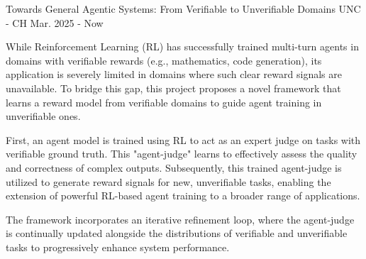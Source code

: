 \begin{cventries}
	\cventry
	{} %
	{Towards General Agentic Systems: From Verifiable to Unverifiable Domains} %
	{UNC - CH} %
	{Mar. 2025 - Now} %
	{
		\begin{cvitems} %
			\item While Reinforcement Learning (RL) has successfully trained multi-turn agents in domains with verifiable rewards (e.g., mathematics, code generation), its application is severely limited in domains where such clear reward signals are unavailable. To bridge this gap, this project proposes a novel framework that learns a reward model from verifiable domains to guide agent training in unverifiable ones.
			\item First, an agent model is trained using RL to act as an expert judge on tasks with verifiable ground truth. This "agent-judge" learns to effectively assess the quality and correctness of complex outputs. Subsequently, this trained agent-judge is utilized to generate reward signals for new, unverifiable tasks, enabling the extension of powerful RL-based agent training to a broader range of applications.
			\item The framework incorporates an iterative refinement loop, where the agent-judge is continually updated alongside the distributions of verifiable and unverifiable tasks to progressively enhance system performance.
		\end{cvitems}
	}


\end{cventries}
